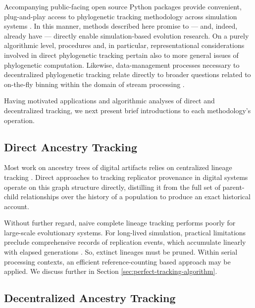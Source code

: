 Accompanying public-facing open source Python packages provide convenient, plug-and-play access to phylogenetic tracking methodology across simulation systems \citep{moreno2022hstrat,dolson2023phylotrackpy}.
In this manner, methods described here promise to --- and, indeed, already have --- directly enable simulation-based evolution research.
On a purely algorithmic level, procedures and, in particular, representational considerations involved in direct phylogenetic tracking pertain also to more general issues of phylogenetic computation.
Likewise, data-management processes necessary to decentralized phylogenetic tracking relate directly to broader questions related to on-the-fly binning within the domain of stream processing \citep{TODO OTHER PREPRINT}.

Having motivated applications and algorithmic analyses of direct and decentralized tracking, we next present brief introductions to each methodology's operation.

\subsection{Direct Ancestry Tracking}

Most work on ancestry trees of digital artifacts relies on centralized lineage tracking \citep{friggeri2014rumor,cohen1987computer,dolson2023phylotrackpy}.
Direct approaches to tracking replicator provenance in digital systems operate on this graph structure directly, distilling it from the full set of parent-child relationships over the history of a population to produce an exact historical account.

Without further regard, naive complete lineage tracking performs poorly for large-scale evolutionary systems.
For long-lived simulation, practical limitations preclude comprehensive records of replication events, which accumulate linearly with elapsed generations \citep{dolson2023algorithms}.
So, extinct lineages must be pruned.
Within serial processing contexts, an efficient reference-counting based approach may be applied.
We discuss further in Section \ref{sec:perfect-tracking-algorithm}.

\subsection{Decentralized Ancestry Tracking}

